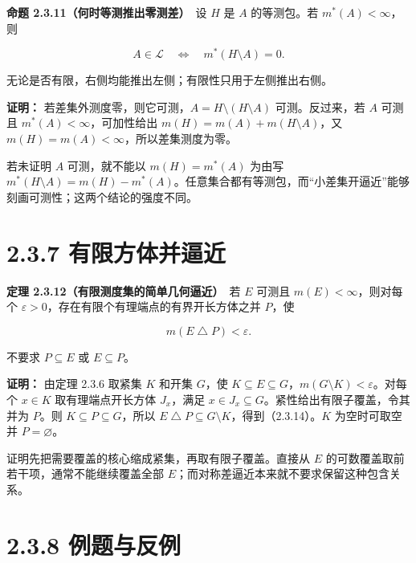 \documentclass[11pt,a4paper]{article}
\begin{document}
\textbf{命题 2.3.11（何时等测推出零测差）}　设 \(H\) 是 \(A\)
的等测包。若 \(m^*(A)<\infty\)，则

\begin{equation*}
A\in\mathcal L\quad\Longleftrightarrow\quad m^*(H\setminus A)=0.
\tag{2.3.13}
\end{equation*}

无论是否有限，右侧均能推出左侧；有限性只用于左侧推出右侧。

\textbf{证明：} 若差集外测度零，则它可测，\(A=H\setminus(H\setminus A)\)
可测。反过来，若 \(A\) 可测且 \(m^*(A)<\infty\)，可加性给出
\(m(H)=m(A)+m(H\setminus A)\)，又
\(m(H)=m(A)<\infty\)，所以差集测度为零。

若未证明 \(A\) 可测，就不能以 \(m(H)=m^*(A)\) 为由写
\(m^*(H\setminus A)=m(H)-m^*(A)\)。任意集合都有等测包，而``小差集开逼近''能够刻画可测性；这两个结论的强度不同。

\section[\S{}2.3.7
有限方体并逼近]{2.3.7
有限方体并逼近}\label{ux6709ux9650ux65b9ux4f53ux5e76ux903cux8fd1}

\textbf{定理 2.3.12（有限测度集的简单几何逼近）}　若 \(E\) 可测且
\(m(E)<\infty\)，则对每个
\(\varepsilon>0\)，存在有限个有理端点的有界开长方体之并 \(P\)，使

\begin{equation*}
m(E\mathbin{\triangle}P)<\varepsilon.
\tag{2.3.14}
\end{equation*}

不要求 \(P\subseteq E\) 或 \(E\subseteq P\)。

\textbf{证明：} 由定理 2.3.6 取紧集 \(K\) 和开集 \(G\)，使
\(K\subseteq E\subseteq G\)，\(m(G\setminus K)<\varepsilon\)。对每个
\(x\in K\) 取有理端点开长方体 \(J_x\)，满足
\(x\in J_x\subseteq G\)。紧性给出有限子覆盖，令其并为 \(P\)。则
\(K\subseteq P\subseteq G\)，所以
\(E\mathbin{\triangle}P\subseteq G\setminus K\)，得到（2.3.14）。\(K\)
为空时可取空并 \(P=\varnothing\)。

证明先把需要覆盖的核心缩成紧集，再取有限子覆盖。直接从 \(E\)
的可数覆盖取前若干项，通常不能继续覆盖全部
\(E\)；而对称差逼近本来就不要求保留这种包含关系。

\section[\S{}2.3.8 例题与反例]{2.3.8 例题与反例}\label{ux4f8bux9898ux4e0eux53cdux4f8b}
\end{document}
